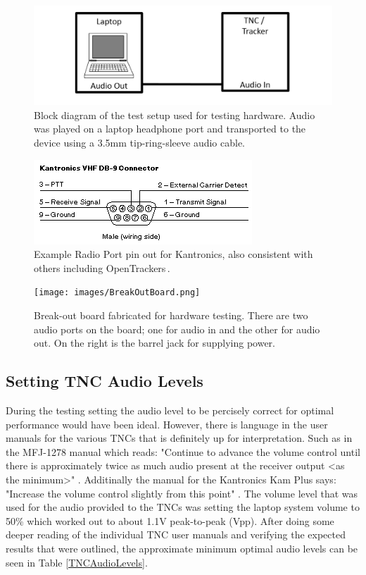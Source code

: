 \begin{figure}
  \centering
	\includegraphics[width=0.75\linewidth]{images/TNCLaptopTestSetup.PNG} 
	\caption{Block diagram of the test setup used for testing hardware. Audio was played on a laptop headphone port and transported to the device using a 3.5mm tip-ring-sleeve audio cable.}
   \label{TNCLaptopTestSetup}
\end{figure}
\begin{figure}
  \centering
	\includegraphics[width=0.75\linewidth]{images/RadioPortPinout.png} 
	\caption{Example Radio Port pin out for Kantronics, also consistent with others including OpenTrackers\,\cite{Martin2014}.}
   \label{RadioPortPinout}
\end{figure}
\begin{figure}
  \centering
	\texttt{[image: images/BreakOutBoard.png]} 
	\caption{Break-out board fabricated for hardware testing. There are two audio ports on the board; one for audio in and the other for audio out. On the right is the barrel jack for supplying power.}
   \label{BreakOutBoard}
\end{figure}

\subsection{Setting TNC Audio Levels}
During the testing setting the audio level to be percisely correct for optimal performance would have been ideal. However, there is language in the user manuals for the various TNCs that is definitely up for interpretation. Such as in the MFJ-1278 manual which reads: "Continue to advance the volume control until there is approximately twice as much audio present at the receiver output <as the minimum>" \cite{MFJ1278Man}. Additinally the manual for the Kantronics Kam Plus says: "Increase the volume control slightly from this point" \cite{KamPlusGettingStarted}. The volume level that was used for the audio provided to the TNCs was setting the laptop system volume to 50\% which worked out to about 1.1V peak-to-peak (Vpp). After doing some deeper reading of the individual TNC user manuals and verifying the expected results that were outlined, the approximate minimum optimal audio levels can be seen in Table \ref{TNCAudioLevels}.

